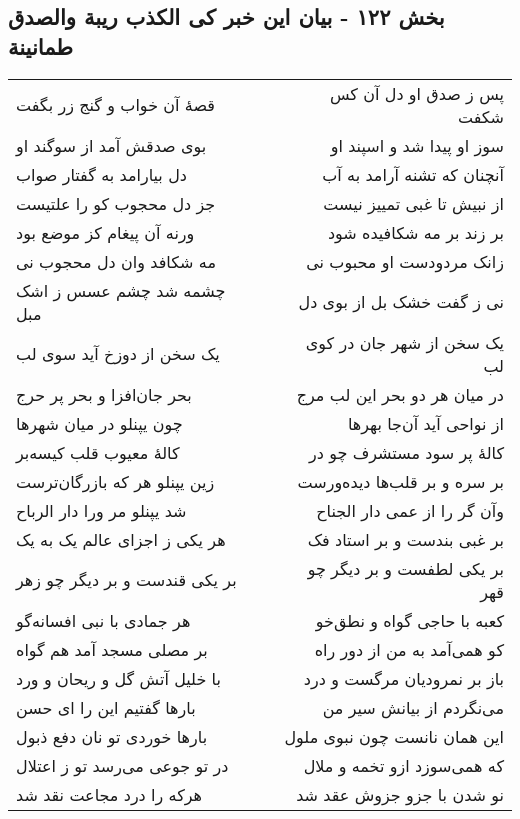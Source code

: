 \begin{center}
\section*{بخش ۱۲۲ - بیان این خبر کی الکذب ریبة والصدق طمانینة}
\label{sec:sh122}
\begin{longtable}{l p{0.5cm} r}
قصهٔ آن خواب و گنج زر بگفت
&&
پس ز صدق او دل آن کس شکفت
\\
بوی صدقش آمد از سوگند او
&&
سوز او پیدا شد و اسپند او
\\
دل بیارامد به گفتار صواب
&&
آنچنان که تشنه آرامد به آب
\\
جز دل محجوب کو را علتیست
&&
از نبیش تا غبی تمییز نیست
\\
ورنه آن پیغام کز موضع بود
&&
بر زند بر مه شکافیده شود
\\
مه شکافد وان دل محجوب نی
&&
زانک مردودست او محبوب نی
\\
چشمه شد چشم عسس ز اشک مبل
&&
نی ز گفت خشک بل از بوی دل
\\
یک سخن از دوزخ آید سوی لب
&&
یک سخن از شهر جان در کوی لب
\\
بحر جان‌افزا و بحر پر حرج
&&
در میان هر دو بحر این لب مرج
\\
چون یپنلو در میان شهرها
&&
از نواحی آید آن‌جا بهرها
\\
کالهٔ معیوب قلب کیسه‌بر
&&
کالهٔ پر سود مستشرف چو در
\\
زین یپنلو هر که بازرگان‌ترست
&&
بر سره و بر قلب‌ها دیده‌ورست
\\
شد یپنلو مر ورا دار الرباح
&&
وآن گر را از عمی دار الجناح
\\
هر یکی ز اجزای عالم یک به یک
&&
بر غبی بندست و بر استاد فک
\\
بر یکی قندست و بر دیگر چو زهر
&&
بر یکی لطفست و بر دیگر چو قهر
\\
هر جمادی با نبی افسانه‌گو
&&
کعبه با حاجی گواه و نطق‌خو
\\
بر مصلی مسجد آمد هم گواه
&&
کو همی‌آمد به من از دور راه
\\
با خلیل آتش گل و ریحان و ورد
&&
باز بر نمرودیان مرگست و درد
\\
بارها گفتیم این را ای حسن
&&
می‌نگردم از بیانش سیر من
\\
بارها خوردی تو نان دفع ذبول
&&
این همان نانست چون نبوی ملول
\\
در تو جوعی می‌رسد تو ز اعتلال
&&
که همی‌سوزد ازو تخمه و ملال
\\
هرکه را درد مجاعت نقد شد
&&
نو شدن با جزو جزوش عقد شد
\\

\end{longtable}
\end{center}
